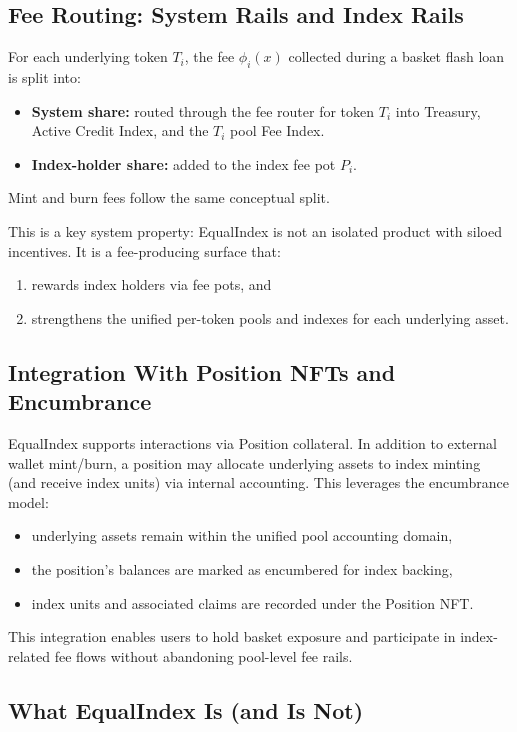 \documentclass[version=preprint]{iacrcc}
\begin{document}
\subsection{Fee Routing: System Rails and Index Rails}

For each underlying token $T_i$, the fee $\phi_i(x)$ collected during a basket flash loan is split into:
\begin{itemize}
  \item \textbf{System share:} routed through the fee router for token $T_i$ into Treasury, Active Credit Index, and the $T_i$ pool Fee Index.
  \item \textbf{Index-holder share:} added to the index fee pot $P_i$.
\end{itemize}
Mint and burn fees follow the same conceptual split.

This is a key system property: EqualIndex is not an isolated product with siloed incentives. It is a fee-producing surface that:
\begin{enumerate}
  \item rewards index holders via fee pots, and
  \item strengthens the unified per-token pools and indexes for each underlying asset.
\end{enumerate}

\subsection{Integration With Position NFTs and Encumbrance}

EqualIndex supports interactions via Position collateral. In addition to external wallet mint/burn, a position may allocate underlying assets to index minting (and receive index units) via internal accounting. This leverages the encumbrance model:
\begin{itemize}
  \item underlying assets remain within the unified pool accounting domain,
  \item the position's balances are marked as encumbered for index backing,
  \item index units and associated claims are recorded under the Position NFT.
\end{itemize}

This integration enables users to hold basket exposure and participate in index-related fee flows without abandoning pool-level fee rails.

\subsection{What EqualIndex Is (and Is Not)}
\end{document}
